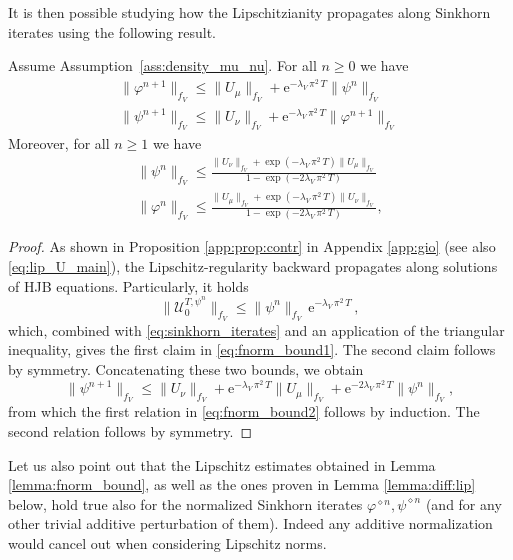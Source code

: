\documentclass[final,12pt]{colt2023} %
\newcommand{\bes}{\begin{equation}}
\newcommand{\ees}{\end{equation}}
\newcommand{\be}{\begin{equation}}
\newcommand{\ee}{\end{equation}}
\newcommand{\rme}{\mathrm{e}}
\begin{document}
It is then possible studying how the Lipschitzianity propagates along Sinkhorn iterates using the following result. 


 

\begin{lemma}\label{lemma:fnorm_bound}
  Assume Assumption~\ref{ass:density_mu_nu}. 
For all $n\geq 0$ we have
\be\label{eq:fnorm_bound1}
\begin{split}
\|\varphi^{n+1}\|_{f_V} \leq \|U_{\mu} \|_{f_V}+   \rme^{-\lambda_V\,\pi^2\, T} \|\psi^n\|_{f_V}\\
\|\psi^{n+1}\|_{f_V} \leq \|U_{\nu} \|_{f_V}+   \rme^{-\lambda_V \,\pi^2\,T} \|\varphi^{n+1}\|_{f_V}\,
\end{split}
\ee
Moreover, for all $n\geq 1$ we have
\be\label{eq:fnorm_bound2}
\begin{split}
\|\psi^n \|_{f_V} \leq \frac{\|U_{\nu}\|_{f_V}+\exp(-\lambda_V \,\pi^2\,T)\|U_{\mu}\|_{f_V}}{1-\exp(-2\lambda_V\,\pi^2\, T)} \\
\|\varphi^n \|_{f_V}\leq  \frac{\|U_{\mu}\|_{f_V}+\exp(-\lambda_V\,\pi^2\, T)\|U_{\nu}\|_{f_V}}{1-\exp(-2\lambda_V \,\pi^2\,T)},
\end{split}
\ee
\end{lemma}
\begin{proof}
As shown in Proposition \ref{app:prop:contr} in Appendix \ref{app:gio} (see also \eqref{eq:lip_U_main}), the Lipschitz-regularity backward propagates along solutions of HJB equations. Particularly, it holds 
\bes
\| \mathcal{U}^{T,\psi^n}_0\|_{f_V}\leq \|\psi^n\|_{f_V}\, \rme^{-\lambda_V\,\pi^2\, T} \, ,
\ees
which, combined with \eqref{eq:sinkhorn_iterates} and an application of the triangular inequality, gives the first claim in \eqref{eq:fnorm_bound1}. The second claim follows by symmetry. Concatenating these two bounds, we obtain
\bes
\|\psi^{n+1}\|_{f_V} \leq \|U_{\nu} \|_{f_V}+   \rme^{-\lambda_V \,\pi^2\,T}\|U_{\mu}\|_{f_V}+\rme^{-2\lambda_V \,\pi^2\,T}\|\psi^{n} \|_{f_V},
 \ees
from which the first relation in \eqref{eq:fnorm_bound2} follows by induction. The second relation follows by symmetry.
\end{proof}

 \begin{remark}
Let us also point out that the Lipschitz estimates obtained in Lemma \ref{lemma:fnorm_bound}, as well as the ones proven in Lemma \ref{lemma:diff:lip} below, hold true also for the normalized Sinkhorn iterates $\varphi^{\diamond n},\psi^{\diamond n}$ (and for any other trivial additive perturbation of them). Indeed any additive normalization would cancel out when considering Lipschitz norms.
\end{remark}
\end{document}
